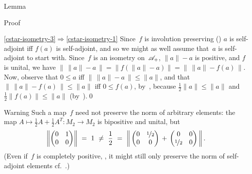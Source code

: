 \documentclass[a]{subfiles}
\begin{document}
\begin{parsec}
\begin{point}{Lemma}
\begin{point}{Proof}
\begin{point}{\ref{cstar-isometry-3}$\Longrightarrow$\ref{cstar-isometry-1}}
Since~$f$ is involution preserving ()
$a$ is self-adjoint iff $f(a)$ is self-adjoint,
and so we might as well assume that~$a$ is self-adjoint
to start with.
Since~$f$ is an isometry on~$\mathscr{A}_+$,
$\|a\|-a$ is positive,
and $f$ is unital,
we have $\|\,\|a\|-a\,\|=\|f(\|a\|-a)\|=\|\,\|a\|-f(a)\,\|$.
Now,
observe that
$0\leq a$
iff
$ \|\,\|a\|-a\,\|\leq \|a\|$,
and that
$\|\,\|a\|-f(a)\,\|\leq \|a\|$ 
iff $0\leq f(a)$,
by~,
because $\frac{1}{2}\|a\|\leq \|a\|$
and $\frac{1}{2}\|f(a)\|\leq  \|a\|$
(by~).\qed
\end{point}
\end{point}
\begin{point}{Warning}%
Such a map~$f$ need not preserve the norm of arbitrary elements:
the map $A\mapsto \frac{1}{2}A+\frac{1}{2}A^T\colon M_2\to M_2$
is bipositive and unital,
but
\begin{equation*}
\left\|\left(\begin{matrix}0&1\\0&0\end{matrix}
\right)\right\|
\ = \ 1 \ \neq \ \frac{1}{2}\ = \ 
\left\|\,\left(\begin{matrix}0 & \nicefrac{1}{2} \\ 0 & 0
\end{matrix}\right)
\,+\,\left(\begin{matrix}0 & 0\\ \nicefrac{1}{2} & 0
\end{matrix}\right)\,\right\|.
\end{equation*}
(Even if~$f$ is completely positive, ,
it might still only preserve the norm of self-adjoint elements
cf.~.)
\end{point}
\end{point}
\end{parsec}
\end{document}
